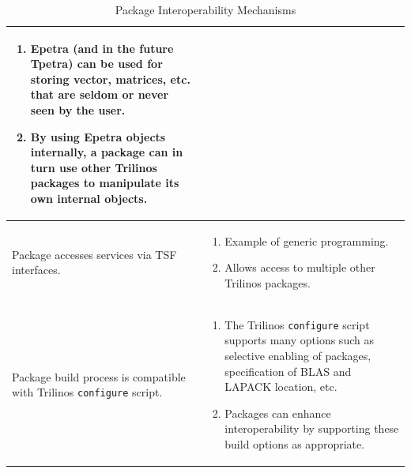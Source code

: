 \documentclass[acmtoms,acmnow]{acmtrans2m}
\begin{document}
\begin{table}
\begin{center}
\begin{tabular}{|p{1.75in}|p{2.75in}|}
\begin{enumerate}
\item Epetra (and in the future Tpetra) can be used for storing
vector, matrices, etc. that are seldom or
never seen by the user.  
\item  By using Epetra objects
internally, a package can in turn use other Trilinos packages to
manipulate its own internal objects.
\end{enumerate}\\\hline
Package accesses services via TSF interfaces.&
\begin{enumerate}
\item Example of generic programming.
\item Allows access to multiple other Trilinos packages.
\end{enumerate}\\\hline
Package build process is compatible with Trilinos {\tt configure} script. &
\begin{enumerate}
\item The Trilinos {\tt configure} script supports many options such
as selective enabling of packages, specification of BLAS and LAPACK
location, etc.
\item Packages can enhance interoperability by supporting these build
options as appropriate.
\end{enumerate}\\\hline
\end{tabular}
\caption{\label{Table:Mechanisms} Package Interoperability Mechanisms}
\end{center}
\end{table}
\end{document}
